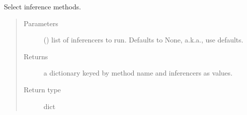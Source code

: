 \documentclass[letterpaper,10pt,english]{sphinxmanual}
\begin{document}
\begin{fulllineitems}
\label{\detokenize{_modules/cosifer.pipelines:cosifer.pipelines.pipeline_gui.method_selection}}
Select inference methods.
\begin{quote}\begin{description}
\item[{Parameters}] \leavevmode
{} () \textendash{} list of inferencers to run. Defaults to None,
a.k.a., use defaults.

\item[{Returns}] \leavevmode
a dictionary keyed by method name and inferencers as values.

\item[{Return type}] \leavevmode
dict

\end{description}\end{quote}

\end{fulllineitems}

\end{document}
